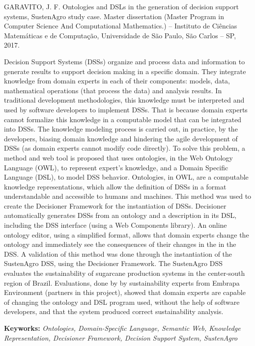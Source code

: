 %
GARAVITO, J. F. \foreignlanguage{english}{Ontologies and DSLs in the
generation of decision support systems, SustenAgro study case. Master
dissertation (Master Program in Computer Science And Computational
Mathematics.)} – Instituto de Ciências Matemáticas e de Computação,
Universidade de São Paulo, São Carlos – SP, 2017.

\vphantom{}

%
Decision Support Systems (DSSs) organize and process data and information
to generate results to support decision making in a specific domain.
They integrate knowledge from domain experts in each of their components:
models, data, mathematical operations (that process the data) and
analysis results. In traditional development methodologies, this knowledge
must be interpreted and used by software developers to implement DSSs.
That is because domain experts cannot formalize this knowledge in
a computable model that can be integrated into DSSs. The knowledge
modeling process is carried out, in practice, by the developers, biasing
domain knowledge and hindering the agile development of DSSs (as domain
experts cannot modify code directly). To solve this problem, a method
and web tool is proposed that uses ontologies, in the Web Ontology
Language (OWL), to represent expert's knowledge, and a Domain Specific
Language (DSL), to model DSS behavior. Ontologies, in OWL, are a computable
knowledge representations, which allow the definition of DSSs in a
format understandable and accessible to humans and machines. This
method was used to create the Decisioner Framework for the instantiation
of DSSs. Decisioner automatically generates DSSs from an ontology
and a description in its DSL, including the DSS interface (using a
Web Components library). An online ontology editor, using a simplified
format, allows that domain experts change the ontology and immediately
see the consequences of their changes in the in the DSS. A validation
of this method was done through the instantiation of the SustenAgro
DSS, using the Decisioner Framework. The SustenAgro DSS evaluates
the sustainability of sugarcane production systems in the center-south
region of Brazil. Evaluations, done by by sustainability experts from
Embrapa Environment (partners in this project), showed that domain
experts are capable of changing the ontology and DSL program used,
without the help of software developers, and that the system produced
correct sustainability analysis. 

%
\vphantom{}

%
\textbf{Keyworks:} \emph{Ontologies, Domain-Specific Language, Semantic
Web, Knowledge Representation, Decisioner Framework, Decision Support
System, SustenAgro }
